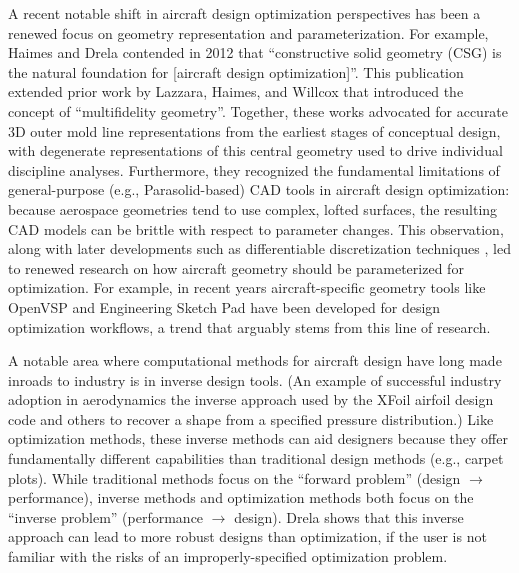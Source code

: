 \documentclass[12pt,vi,oneside]{report}
\begin{document}
    A recent notable shift in aircraft design optimization perspectives has been a renewed focus on geometry representation and parameterization. For example, Haimes and Drela \cite{haimes_construction_2012} contended in 2012 that ``constructive solid geometry (CSG) is the natural foundation for [aircraft design optimization]''. This publication extended prior work by Lazzara, Haimes, and Willcox \cite{lazzara_haimes_willcox_multifidelity_geometry_2009} that introduced the concept of ``multifidelity geometry''. Together, these works advocated for accurate 3D outer mold line representations from the earliest stages of conceptual design, with degenerate representations of this central geometry used to drive individual discipline analyses. Furthermore, they recognized the fundamental limitations of general-purpose (e.g., Parasolid-based) CAD tools in aircraft design optimization: because aerospace geometries tend to use complex, lofted surfaces, the resulting CAD models can be brittle with respect to parameter changes. This observation, along with later developments such as differentiable discretization techniques \cite{esp}, led to renewed research on how aircraft geometry should be parameterized for optimization. For example, in recent years aircraft-specific geometry tools like OpenVSP \cite{mcdonald_open_2022} and Engineering Sketch Pad \cite{esp} have been developed for design optimization workflows, a trend that arguably stems from this line of research.

    A notable area where computational methods for aircraft design have long made inroads to industry is in inverse design tools. (An example of successful industry adoption in aerodynamics the inverse approach used by the XFoil airfoil design code \cite{drela_xfoil_1989} and others \cite{liebeck_blendedwingbody_1998} to recover a shape from a specified pressure distribution.) Like optimization methods, these inverse methods can aid designers because they offer fundamentally different capabilities than traditional design methods (e.g., carpet plots). While traditional methods focus on the ``forward problem'' (design $\rightarrow$ performance), inverse methods and optimization methods both focus on the ``inverse problem'' (performance $\rightarrow$ design). Drela \cite{drela_pros_1998} shows that this inverse approach can lead to more robust designs than optimization, if the user is not familiar with the risks of an improperly-specified optimization problem.
\end{document}
